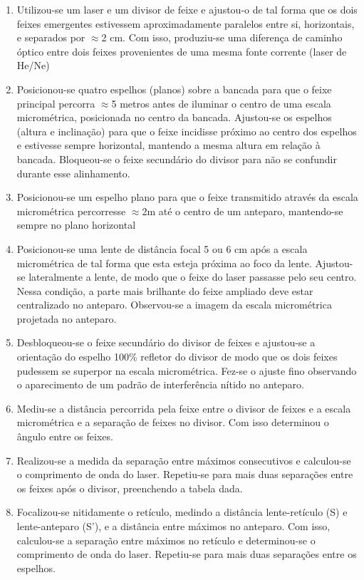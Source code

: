 \documentclass[
12pt,				%
openright,			%
oneside,			%
a4paper,			%
english,			%
french,				%
spanish,			%
brazil,				%
]{abntex2}
\begin{document}
\begin{enumerate}
  
\item Utilizou-se um laser e um divisor de feixe e ajustou-o de tal forma que os dois feixes
  emergentes estivessem aproximadamente paralelos entre si, horizontais, e
  separados por $\approx$2 cm. Com isso, produziu-se uma diferença de caminho óptico entre
  dois feixes provenientes de uma mesma fonte corrente (laser de He/Ne)
\item Posicionou-se quatro espelhos (planos) sobre a bancada para que o feixe principal
  percorra $\approx$5 metros antes de iluminar o centro de uma escala micrométrica,
  posicionada no centro da bancada. Ajustou-se os espelhos (altura e inclinação) para
  que o feixe incidisse próximo ao centro dos espelhos e estivesse sempre horizontal,
  mantendo a mesma altura em relação à bancada. Bloqueou-se o feixe secundário do
  divisor para não se confundir durante esse alinhamento.
\item Posicionou-se um espelho plano para que o feixe transmitido através da escala
  micrométrica percorresse $\approx$2m até o centro de um anteparo, mantendo-se sempre
  no plano horizontal
\item Posicionou-se uma lente de distância focal 5 ou 6 cm após a escala micrométrica de
  tal forma que esta esteja próxima ao foco da lente. Ajustou-se lateralmente a lente,
  de modo que o feixe do laser passasse pelo seu centro. Nessa condição, a parte
  mais brilhante do feixe ampliado deve estar centralizado no anteparo. Observou-se a
  imagem da escala micrométrica projetada no anteparo.
\item Desbloqueou-se o feixe secundário do divisor de feixes e ajustou-se a orientação do
  espelho 100\% refletor do divisor de modo que os dois feixes pudessem se superpor
  na escala micrométrica. Fez-se o ajuste fino observando o aparecimento de um
  padrão de interferência nítido no anteparo.
\item Mediu-se a distância percorrida pela feixe entre o divisor de feixes e a escala
  micrométrica e a separação de feixes no divisor. Com isso determinou o ângulo
  entre os feixes.
\item Realizou-se a medida da separação entre máximos consecutivos e calculou-se o
  comprimento de onda do laser. Repetiu-se para mais duas separações entre os
  feixes após o divisor, preenchendo a tabela dada.
\item Focalizou-se nitidamente o retículo, medindo a distância lente-retículo (S) e
  lente-anteparo (S’), e a distância entre máximos no anteparo. Com isso, calculou-se
  a separação entre máximos no retículo e determinou-se o comprimento de onda do
  laser. Repetiu-se para mais duas separações entre os espelhos.

\end{enumerate}
\end{document}
